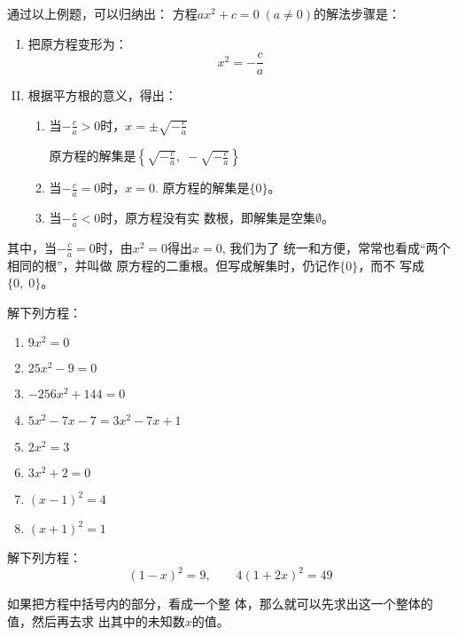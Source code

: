 通过以上例题，可以归纳出：
方程$ax^2+c=0\; (a\ne 0)$的解法步骤是：
\begin{blk}{}
\begin{enumerate}[I. ]
    \item 把原方程变形为：
    $$x^2=-\frac{c}{a}$$
    \item 根据平方根的意义，得出：
    \begin{enumerate}[1.]
        \item 当$-\frac{c}{a}>0$时，$x=\pm\sqrt{-\frac{c}{a}}$

    原方程的解集是$\left\{\sqrt{-\frac{c}{a}}, \; -\sqrt{-\frac{c}{a}}\right\}$
    \item 当$-\frac{c}{a}=0$时，$x=0$.
    原方程的解集是$\{0\}$。
    \item 当$-\frac{c}{a}<0$时，原方程没有实
    数根，即解集是空集$\emptyset$。
    \end{enumerate}
\end{enumerate}
\end{blk}

其中，当$-\frac{c}{a}=0$时，由$x^2=0$得出$x=0$, 我们为了
统一和方便，常常也看成“两个相同的根”，并叫做
原方程的二重根。但写成解集时，仍记作$\{0\}$，而不
写成$\{0,\; 0\}$。

\begin{ex}
    解下列方程：
\begin{multicols}{2}
\begin{enumerate}
    \item $9x^2=0$
    \item $25x^2-9=0$
    \item $-256x^2+144=0$ 
    \item $5x^2-7x-7=3x^2-7x+1$
    \item $2x^2=3$
    \item $3x^2+2=0$
    \item $(x-1)^2=4$
    \item $(x+1)^2=1$
\end{enumerate}
\end{multicols}
\end{ex}


\begin{example}
    解下列方程：
    \[(1-x)^2=9,\qquad 4(1+2x)^2=49\]
\end{example}

\begin{analyze}
    如果把方程中括号内的部分，看成一个整
体，那么就可以先求出这一个整体的值，然后再去求
出其中的未知数$x$的值。
\end{analyze}

